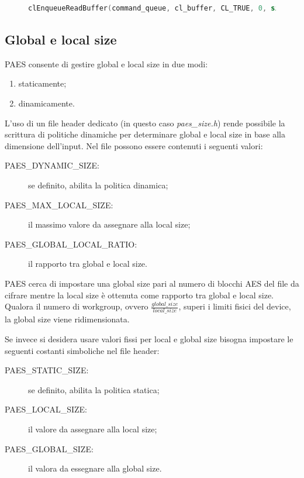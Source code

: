 \documentclass[12pt,a4paper,oneside]{book}
\begin{document}
\begin{figure}
\begin{lstlisting}[caption={\textit{Lettura del risultato dell'esecuzione del kernel.}},label={cod:paes-read-clean},language=C]
clEnqueueReadBuffer(command_queue, cl_buffer, CL_TRUE, 0, sizeof(cl_uchar) * size, buffer, 0, NULL, &event_read);
\end{lstlisting}
\end{figure}

\subsection{Global e local size}
\label{subsec:paes-global-local-size}

PAES consente di gestire global e local size in due modi:
\begin{enumerate}
\item staticamente;
\item dinamicamente.
\end{enumerate}

L'uso di un file header dedicato (in questo caso \textit{paes\_size.h}) rende possibile la scrittura di politiche dinamiche per determinare global e local size in base alla dimensione dell'input. Nel file possono essere contenuti i seguenti valori:
\begin{description}
\item[PAES\_DYNAMIC\_SIZE:] se definito, abilita la politica dinamica;
\item[PAES\_MAX\_LOCAL\_SIZE:] il massimo valore da assegnare alla local size;
\item[PAES\_GLOBAL\_LOCAL\_RATIO:] il rapporto tra global e local size.
\end{description}

PAES cerca di impostare una global size pari al numero di blocchi \ac{AES} del file da cifrare mentre la local size è ottenuta come rapporto tra global e local size. Qualora il numero di workgroup, ovvero $\frac{global\_size}{local\_size}$, superi i limiti fisici del device, la global size viene ridimensionata.

Se invece si desidera usare valori fissi per local e global size bisogna impostare le seguenti costanti simboliche nel file header:
\begin{description}
\item[PAES\_STATIC\_SIZE:] se definito, abilita la politica statica;
\item[PAES\_LOCAL\_SIZE:] il valore da assegnare alla local size;
\item[PAES\_GLOBAL\_SIZE:] il valora da essegnare alla global size.
\end{description}
\end{document}
